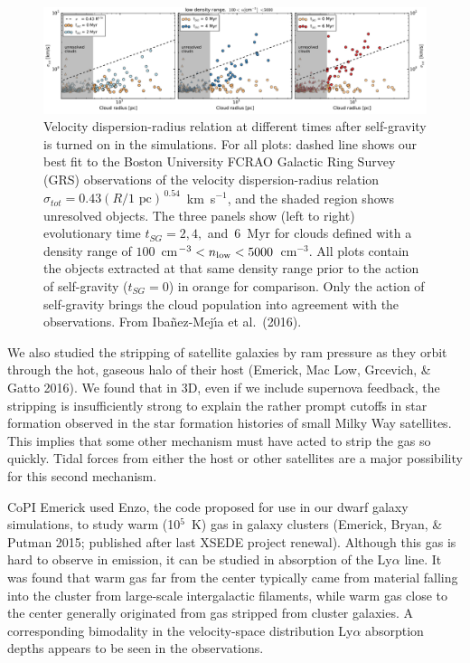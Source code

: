 \documentclass[11pt,preprint]{article}
\begin{document}
\begin{figure} 
\includegraphics[width=1.0\textwidth]{Sigma-R_low.pdf}

\caption{Velocity dispersion-radius relation 
at different times after self-gravity is turned on in the simulations.
For all plots: dashed line shows our best fit to the Boston University FCRAO Galactic Ring Survey (GRS) observations of the velocity dispersion-radius relation $\sigma_{tot} =0.43 (R/\mbox{1 pc})^{\,0.54}$~km~s$^{-1}$, and the shaded region shows unresolved objects.
The three panels show (left to right) evolutionary time $t_{SG} = 2, 4,$ and~6~Myr for clouds defined with a density range of $100$~cm$^{-3} <  n_{\rm{low}}   < 5000$~cm$^{-3}$. All plots contain the objects extracted at that same density range prior to the action of self-gravity  ($t_{SG} = 0$) in orange for comparison.  Only the action of self-gravity brings the cloud population into agreement with the observations.
From Iba\~nez-Mej\'{\i}a et al.\ (2016).
\label{fig:sigma-L-evolution}
} 
\end{figure} 


We also studied the stripping of satellite galaxies by ram pressure as they orbit through the hot, gaseous halo of their host (Emerick, Mac Low, Grcevich, \& Gatto 2016). We found that in 3D, even if we include supernova feedback, the stripping is insufficiently strong to explain the rather prompt cutoffs in star formation observed in the star formation histories of small Milky Way satellites.  This implies that some other mechanism must have acted to strip the gas so quickly. Tidal forces from either the host or other satellites are a major possibility for this second mechanism.

CoPI Emerick used Enzo, the code proposed for use in our dwarf galaxy simulations, to study warm (10$^5$~K) gas in galaxy clusters (Emerick, Bryan, \& Putman 2015; published after last XSEDE project renewal).  Although this gas is hard to observe in emission, it can be studied in absorption of the Ly$\alpha$ line.  It was found that warm gas far from the center typically came from material falling into the cluster from large-scale intergalactic filaments, while warm gas close to the center generally originated from gas stripped from cluster galaxies.  A corresponding bimodality in the velocity-space distribution Ly$\alpha$ absorption depths appears to be seen in the observations.
\end{document}
